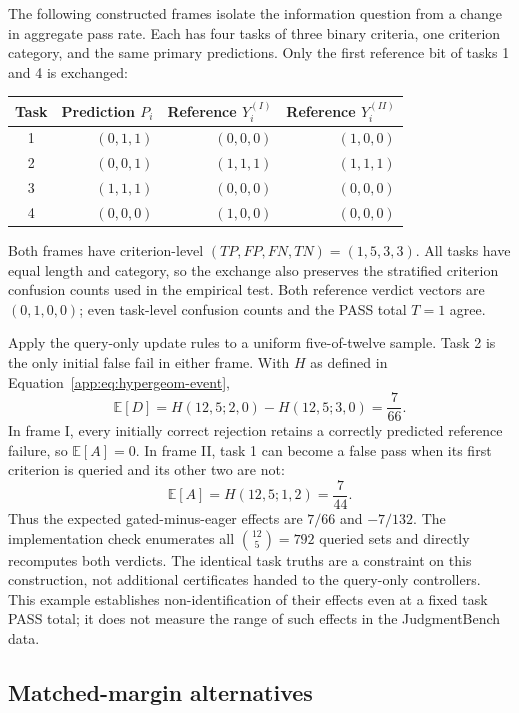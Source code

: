 The following constructed frames isolate the information question from a
change in aggregate pass rate. Each has four tasks of three binary
criteria, one criterion category, and the same primary predictions.
Only the first reference bit of tasks 1 and 4 is exchanged:
\begin{center}
\begin{tabular}{crrr}
\toprule
Task & Prediction $P_i$ & Reference $Y_i^{(I)}$ & Reference $Y_i^{(II)}$\\
\midrule
1 & $(0,1,1)$ & $(0,0,0)$ & $(1,0,0)$\\
2 & $(0,0,1)$ & $(1,1,1)$ & $(1,1,1)$\\
3 & $(1,1,1)$ & $(0,0,0)$ & $(0,0,0)$\\
4 & $(0,0,0)$ & $(1,0,0)$ & $(0,0,0)$\\
\bottomrule
\end{tabular}
\end{center}
Both frames have criterion-level $(TP,FP,FN,TN)=(1,5,3,3)$.
All tasks have equal length and category, so the exchange also preserves
the stratified criterion confusion counts used in the empirical test.
Both reference verdict vectors are $(0,1,0,0)$; even task-level confusion
counts and the PASS total $T=1$ agree.

Apply the query-only update rules to a uniform five-of-twelve sample.
Task 2 is the only initial false fail in either frame. With
$H$ as defined in Equation~\eqref{app:eq:hypergeom-event},
\[
 \mathbb E[D]=H(12,5;2,0)-H(12,5;3,0)=\frac{7}{66}.
\]
In frame I, every initially correct rejection retains a correctly
predicted reference failure, so $\mathbb E[A]=0$. In frame II, task 1
can become a false pass when its first criterion is queried and its other
two are not:
\[
 \mathbb E[A]=H(12,5;1,2)=\frac{7}{44}.
\]
Thus the expected gated-minus-eager effects are $7/66$ and $-7/132$.
The implementation check enumerates all $\binom{12}{5}=792$ queried sets
and directly recomputes both verdicts. The identical task truths are a
constraint on this construction, not additional certificates handed to
the query-only controllers. This example establishes non-identification
of their effects even at a fixed task PASS total; it does not measure the
range of such effects in the JudgmentBench data.

\subsection{Matched-margin alternatives}
\label{app:permutations}

